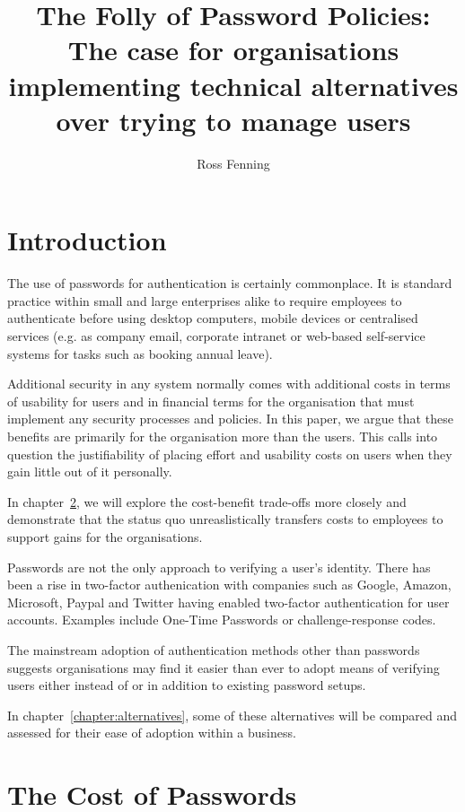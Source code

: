 \documentclass{report}
\title{The Folly of Password Policies: The case for organisations implementing technical alternatives over trying to manage users}
\author{Ross Fenning}
\begin{document}
\maketitle
\tableofcontents

\chapter{Introduction}

The use of passwords for authentication is certainly commonplace.
It is standard practice within small and large enterprises alike
to require employees to authenticate before using desktop
computers, mobile devices or centralised services (e.g.
as company email, corporate intranet or web-based self-service
systems for tasks such as booking annual leave).

Additional security in any system normally comes with additional costs
in terms of usability for users and in financial terms for the organisation
that must implement any security processes and policies. In this paper, we
argue that these benefits are primarily for the organisation more than the
users. This calls into question the justifiability of placing
effort and usability costs on users when they gain little out of it
personally.

In chapter~\ref{chapter:costs}, we will explore the
cost-benefit trade-offs more closely and demonstrate that the status
quo unreaslistically transfers costs to employees to support gains
for the organisations.

Passwords are not the only approach to verifying a user's identity.
There
has been a rise in two-factor authenication with companies
such as Google, Amazon, Microsoft, Paypal and Twitter having enabled
two-factor authentication for user accounts. Examples include One-Time
Passwords or challenge-response codes.

The mainstream adoption of authentication methods other than
passwords suggests organisations may find it easier than ever to adopt
means of verifying users either instead of or in addition to
existing password setups.

In chapter~\ref{chapter:alternatives}, some of these alternatives will be
compared and assessed for their ease of adoption within a business.

\chapter{The Cost of Passwords}
\label{chapter:costs}
\end{document}
